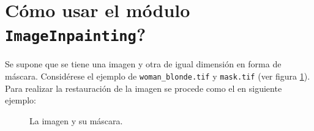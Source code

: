 \section{\textquestiondown C\'omo usar el m\'odulo \texttt{ImageInpainting}?}\label{sec:module_how_to_use}
Se supone que se tiene una imagen y otra de igual dimensión en forma de m\'ascara. Considérese el ejemplo de  \texttt{woman\_blonde.tif} y \texttt{mask.tif} (ver figura \ref{fig:woman_blonde}). Para realizar la restauraci\'on de la imagen se procede como el en siguiente ejemplo:
\begin{figure}[H]
	\centering
	\qquad
	\caption{La imagen y su m\'ascara.}
	\label{fig:woman_blonde}
\end{figure}

